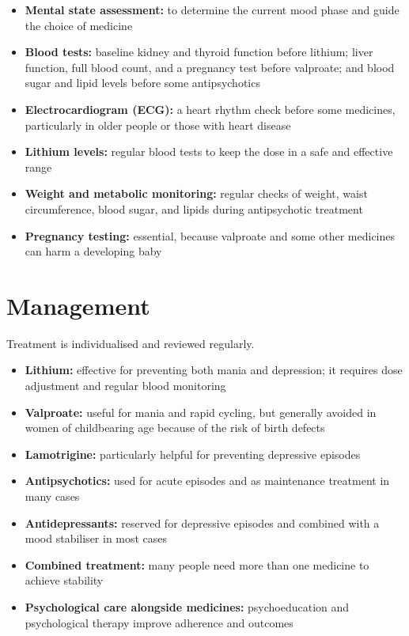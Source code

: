 \begin{itemize}
    \item \textbf{Mental state assessment:} to determine the current mood phase and guide the choice of medicine
    \item \textbf{Blood tests:} baseline kidney and thyroid function before lithium; liver function, full blood count, and a pregnancy test before valproate; and blood sugar and lipid levels before some antipsychotics
    \item \textbf{Electrocardiogram (ECG):} a heart rhythm check before some medicines, particularly in older people or those with heart disease
    \item \textbf{Lithium levels:} regular blood tests to keep the dose in a safe and effective range
    \item \textbf{Weight and metabolic monitoring:} regular checks of weight, waist circumference, blood sugar, and lipids during antipsychotic treatment
    \item \textbf{Pregnancy testing:} essential, because valproate and some other medicines can harm a developing baby
\end{itemize}

\section*{Management}
Treatment is individualised and reviewed regularly.

\begin{itemize}
    \item \textbf{Lithium:} effective for preventing both mania and depression; it requires dose adjustment and regular blood monitoring
    \item \textbf{Valproate:} useful for mania and rapid cycling, but generally avoided in women of childbearing age because of the risk of birth defects
    \item \textbf{Lamotrigine:} particularly helpful for preventing depressive episodes
    \item \textbf{Antipsychotics:} used for acute episodes and as maintenance treatment in many cases
    \item \textbf{Antidepressants:} reserved for depressive episodes and combined with a mood stabiliser in most cases
    \item \textbf{Combined treatment:} many people need more than one medicine to achieve stability
    \item \textbf{Psychological care alongside medicines:} psychoeducation and psychological therapy improve adherence and outcomes
\end{itemize}

